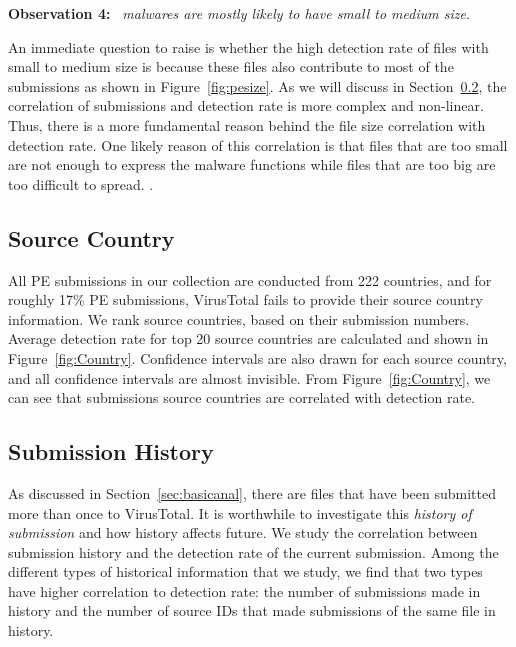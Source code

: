 {\bf Observation 4:} 
{\em \pe\ malwares are mostly likely to have small to medium size.}

An immediate question to raise is whether the high detection rate of files with small to medium size
is because these files also contribute to most of the submissions as shown in Figure~\ref{fig:pesize}.
As we will discuss in Section~\ref{sec:history}, the correlation of submissions and detection rate is more complex and non-linear.
Thus, there is a more fundamental reason behind the file size correlation with detection rate.
One likely reason of this correlation is that files that are too small are not enough to express the
malware functions while files that are too big 
{\color{red} are too difficult to spread.}
.

\subsection{Source Country}
\label{sec:country}

All PE submissions in our collection are conducted from 222 countries, 
and for roughly 17\% PE submissions, 
VirusTotal fails to provide their source country information. 
We rank source countries, based on their submission numbers. 
Average detection rate for top 20 source countries are calculated and shown in 
Figure~\ref{fig:Country}. 
Confidence intervals are also drawn for each source country, 
and all confidence intervals are almost invisible. 
From Figure~\ref{fig:Country}, 
we can see that submissions source countries are correlated with detection rate.

\fi


\subsection{Submission History}
\label{sec:history}

%



As discussed in Section~\ref{sec:basicanal}, there are files that have been submitted more than once to VirusTotal. 
It is worthwhile to investigate this {\em history of submission} and how history affects future.
We study the correlation between submission history and the detection rate of the current submission.
Among the different types of historical information that we study,
we find that two types have higher correlation to detection rate:
the number of submissions made in history and the number of source IDs that made submissions of the same file in history.

